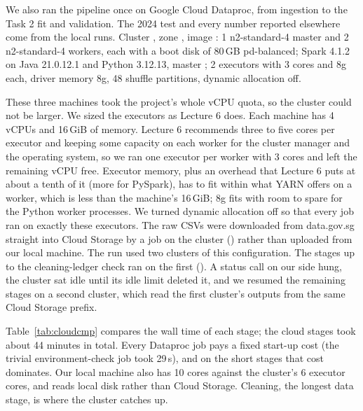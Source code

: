 We also ran the pipeline once on Google Cloud Dataproc, from ingestion to the Task 2 fit and validation. The 2024 test and every number reported elsewhere come from the local runs. Cluster , zone , image : 1 n2-standard-4 master and 2 n2-standard-4 workers, each with a boot disk of 80\,GB pd-balanced; Spark 4.1.2 on Java 21.0.12.1 and Python 3.12.13, master ; 2 executors with 3 cores and 8g each, driver memory 8g, 48 shuffle partitions, dynamic allocation off.

These three machines took the project's whole vCPU quota, so the cluster could not be larger. We sized the executors as Lecture 6 does. Each machine has 4 vCPUs and 16\,GiB of memory. Lecture 6 recommends three to five cores per executor and keeping some capacity on each worker for the cluster manager and the operating system, so we ran one executor per worker with 3 cores and left the remaining vCPU free. Executor memory, plus an overhead that Lecture 6 puts at about a tenth of it (more for PySpark), has to fit within what YARN offers on a worker, which is less than the machine's 16\,GiB; 8g fits with room to spare for the Python worker processes. We turned dynamic allocation off so that every job ran on exactly these executors. The raw CSVs were downloaded from data.gov.sg straight into Cloud Storage by a job on the cluster () rather than uploaded from our local machine. The run used two clusters of this configuration. The stages up to the cleaning-ledger check ran on the first (). A status call on our side hung, the cluster sat idle until its idle limit deleted it, and we resumed the remaining stages on a second cluster, which read the first cluster's outputs from the same Cloud Storage prefix.

Table~\ref{tab:cloudcmp} compares the wall time of each stage; the cloud stages took about 44 minutes in total. Every Dataproc job pays a fixed start-up cost (the trivial environment-check job took 29\,s), and on the short stages that cost dominates. Our local machine also has 10 cores against the cluster's 6 executor cores, and reads local disk rather than Cloud Storage. Cleaning, the longest data stage, is where the cluster catches up.

